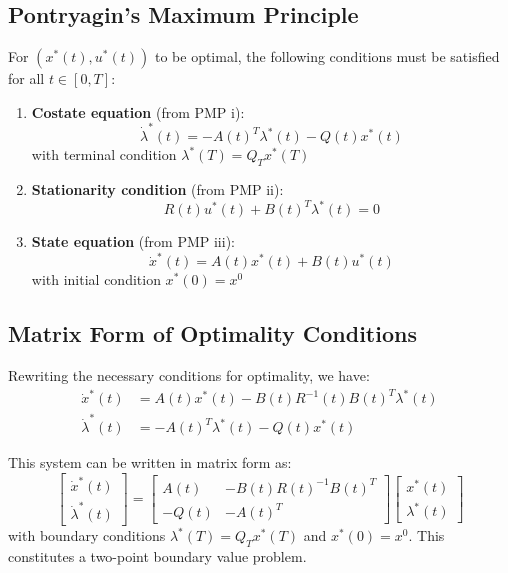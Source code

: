 \documentclass[openany]{book}
\theoremstyle{definition}
\theoremstyle{remark}
\begin{document}
\subsection{Pontryagin's Maximum Principle}
For $(x^*(t),u^*(t))$ to be optimal, the following conditions must be satisfied for all $t\in[0,T]$:

\begin{enumerate}
    \item \textbf{Costate equation} (from PMP i):
        \[
            \dot{\lambda}^*(t) = -A(t)^T\lambda^*(t) - Q(t)x^*(t)
        \]
        with terminal condition $\lambda^*(T) = Q_Tx^*(T)$

    \item \textbf{Stationarity condition} (from PMP ii):
        \[
            R(t)u^*(t) + B(t)^T\lambda^*(t) = 0
        \]

    \item \textbf{State equation} (from PMP iii):
        \[
            \dot{x}^*(t) = A(t)x^*(t) + B(t)u^*(t)
        \]
        with initial condition $x^*(0) = x^0$
\end{enumerate}

\subsection{Matrix Form of Optimality Conditions}
Rewriting the necessary conditions for optimality, we have:
\begin{align*}
    \dot{x}^*(t) &= A(t)x^*(t) - B(t)R^{-1}(t)B(t)^T\lambda^*(t)\\
    \dot{\lambda}^*(t) &= -A(t)^T\lambda^*(t) - Q(t)x^*(t)
\end{align*}

This system can be written in matrix form as:
\[
    \begin{bmatrix}
        \dot{x}^*(t) \\ \dot{\lambda}^*(t)
    \end{bmatrix} = 
    \begin{bmatrix}
        A(t) & -B(t)R(t)^{-1}B(t)^T \\
        -Q(t) & -A(t)^T
    \end{bmatrix}
    \begin{bmatrix}
        x^*(t) \\ \lambda^*(t)
    \end{bmatrix}
\]
with boundary conditions $\lambda^*(T) = Q_Tx^*(T)$ and $x^*(0) = x^0$. This constitutes a two-point boundary value problem.
\end{document}
